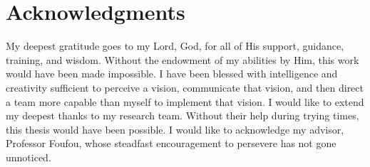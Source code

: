 \chapter*{Acknowledgments}

My deepest gratitude goes to my Lord, God, for all of His support, guidance, training, and wisdom.  Without the endowment of my abilities by Him, this work would have been made impossible.  I have been blessed with intelligence and creativity sufficient to perceive a vision, communicate that vision, and then direct a team more capable than myself to implement that vision.  I would like to extend my deepest thanks to my research team.  Without their help during trying times, this thesis would have been possible. I would like to acknowledge my advisor, Professor Foufou, whose steadfast encouragement to persevere has not gone unnoticed. 

